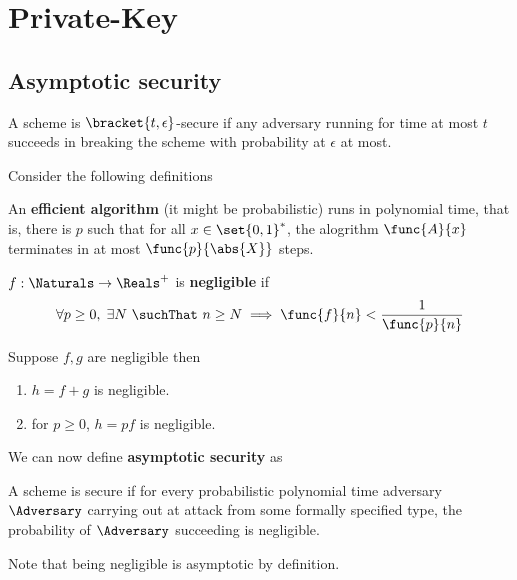 \chapter{Private-Key}

\section{Asymptotic security}
\begin{definition}
    A scheme is \(\bracket{t,\epsilon}\)-secure if any adversary running for time at most \(t\) succeeds in breaking the scheme with probability at \(\epsilon\) at most.
\end{definition}
Consider the following definitions 
\begin{definition}
    An \textbf{efficient algorithm} (it might be probabilistic) runs in polynomial time, that is, there is \(p\) such that for all \(x \in \set{0,1}^{\ast}\), the alogrithm \(\func{A}{x}\) terminates in at most \(\func{p}{\abs{X}}\) steps.
\end{definition}

\begin{definition}
    \(f: \Naturals \to \Reals^+\) is \textbf{negligible} if
    \begin{equation*}
        \forall p \geq 0, \; \exists N \ \suchThat \ n \geq N \implies \func{f}{n} < \dfrac{1}{\func{p}{n}}
    \end{equation*}
\end{definition}

\begin{proposition}
    Suppose \(f,g\) are negligible then 
    \begin{enumerate}
        \item \(h = f + g\) is negligible.
        \item for \(p \geq 0 \), \(h = pf\) is negligible.
    \end{enumerate}
\end{proposition}
We can now define \textbf{asymptotic security} as 
\begin{definition}
    A scheme is secure if for every probabilistic polynomial time adversary \(\Adversary\) carrying out at attack from some formally specified type, the probability of \(\Adversary\) succeeding is negligible.
\end{definition}
Note that being negligible is asymptotic by definition.

